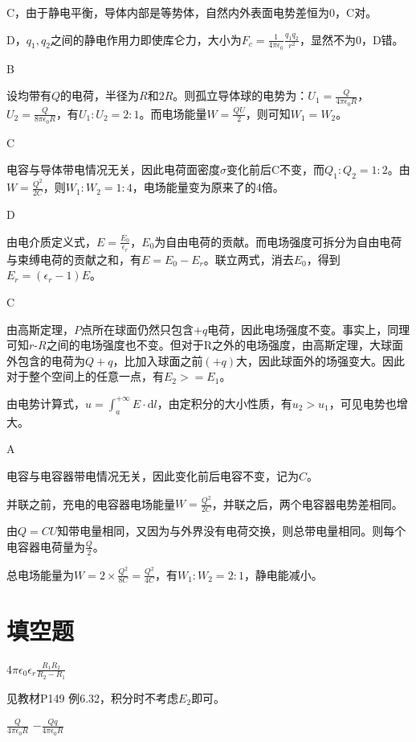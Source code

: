 \documentclass[b5paper,opensource,sourcefont,parskip]{qyxf-book}
\newcommand{\di}[1]{\mathrm{d}#1}
\begin{document}
C，由于静电平衡，导体内部是等势体，自然内外表面电势差恒为$0$，C对。

D，$ q_1,q_2 $之间的静电作用力即使库仑力，大小为$ F_c=\frac{1}{4\pi\epsilon_0}\frac{q_1q_2}{r^2} $，显然不为0，D错。

B

\solve 设均带有$ Q $的电荷，半径为$ R $和$ 2R $。则孤立导体球的电势为：$U_1=\frac{Q}{4\pi\epsilon_0R} $，$ U_2=\frac{Q}{8\pi\epsilon_0R} $，有$ U_1:U_2=2:1 $。而电场能量$ W=\frac{QU}{2} $，则可知$ W_1=W_2 $。

C

\solve 电容与导体带电情况无关，因此电荷面密度$ \sigma $变化前后C不变，而$ Q_1:Q_2=1:2 $。由$ W=\frac{Q^2}{2C} $，则$ W_1:W_2=1:4 $，电场能量变为原来了的4倍。

D

\solve 由电介质定义式，$ E=\frac{E_0}{\epsilon_r} $，$ E_0 $为自由电荷的贡献。而电场强度可拆分为自由电荷与束缚电荷的贡献之和，有$ E=E_0-E_r $。联立两式，消去$ E_0 $，得到$ E_r=(\epsilon_r-1)E $。

C

\solve 由高斯定理，$P$点所在球面仍然只包含$ +q $电荷，因此电场强度不变。事实上，同理可知$r$-$R$之间的电场强度也不变。但对于R之外的电场强度，由高斯定理，大球面外包含的电荷为$ Q+q $，比加入球面之前$ (+q) $大，因此球面外的场强变大。因此对于整个空间上的任意一点，有$ E_2>=E_1 $。

由电势计算式，$ u=\int_a^{+\infty} E\cdot\di{l} $，由定积分的大小性质，有$ u_2>u_1 $，可见电势也增大。

A

\solve 电容与电容器带电情况无关，因此变化前后电容不变，记为$ C $。

并联之前，充电的电容器电场能量$ W=\frac{Q^2}{2C} $，并联之后，两个电容器电势差相同。

由$ Q=CU $知带电量相同，又因为与外界没有电荷交换，则总带电量相同。则每个电容器电荷量为$ \frac{Q}{2} $。

总电场能量为$ W=2\times \frac{Q^2}{8C}=\frac{Q^2}{4C} $，有$ W_1:W_2=2:1 $，静电能减小。

\section{填空题}
 $4\pi\epsilon_0\epsilon_r\frac{R_1R_2}{R_2-R_1}$

\solve 见教材P149 例6.32，积分时不考虑$E_2$即可。

 $\frac{Q}{4\pi\epsilon_0 R}$ \quad $-\frac{Qq}{4\pi\epsilon_0 R}$
\end{document}
